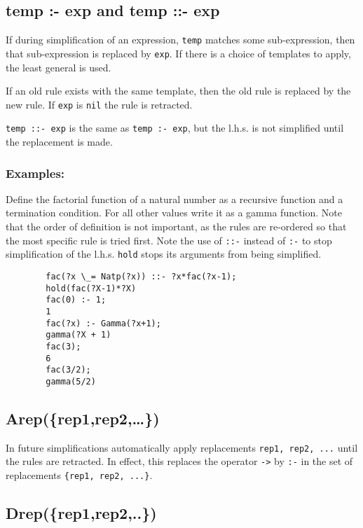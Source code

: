 \subsection{temp :- exp and temp ::- exp}

If during simplification of an expression, \texttt{temp} matches some
sub-expression, then that sub-expression is replaced by \texttt{exp}.  If there
is a choice of templates to apply, the least general is used.

If an old rule exists with the same template, then the old rule is replaced by
the new rule.  If \texttt{exp} is \texttt{nil} the rule is retracted.

\texttt{temp ::- exp} is the same as \texttt{temp :- exp}, but the l.h.s. is not
simplified until the replacement is made.

\subsubsection*{Examples:}

Define the factorial function of a natural number as a recursive function and a
termination condition.  For all other values write it as a gamma function.  Note
that the order of definition is not important, as the rules are re-ordered so
that the most specific rule is tried first.  Note the use of \texttt{::-}
instead of \texttt{:-} to stop simplification of the l.h.s.  \texttt{hold} stops
its arguments from being simplified. 
\begin{verbatim}
        fac(?x \_= Natp(?x)) ::- ?x*fac(?x-1);
        hold(fac(?X-1)*?X)
        fac(0) :- 1;
        1
        fac(?x) :- Gamma(?x+1);
        gamma(?X + 1)
        fac(3);
        6
        fac(3/2);
        gamma(5/2)
\end{verbatim}



\subsection{Arep(\{rep1,rep2,\ldots\})}

In future simplifications automatically apply replacements \texttt{rep1, rep2,
  ...} until the rules are retracted.  In effect, this replaces the operator
\texttt{->} by \texttt{:-} in the set of replacements \texttt{\{rep1, rep2,
  ...\}}.


\subsection{Drep(\{rep1,rep2,..\})}

